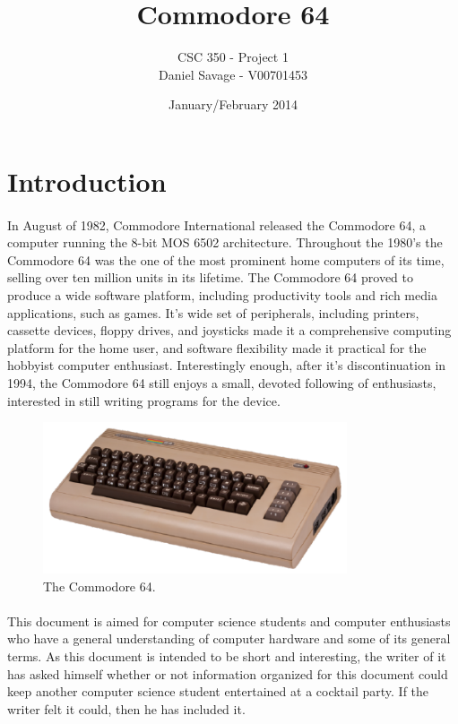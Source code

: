 \documentclass{article}
\title{Commodore 64}
\author{CSC 350 - Project 1 \\ Daniel Savage - V00701453}
\date{January/February 2014}
\begin{document}
   \maketitle
   
\pagebreak{}

\tableofcontents

\pagebreak{}
   
\section{Introduction}
\paragraph{}
In August of 1982, Commodore International released the Commodore 64, a computer running the 8-bit MOS 6502 architecture. Throughout the 1980's the Commodore 64 was the one of the most prominent home computers of its time, selling over ten million units in its lifetime. The Commodore 64 proved to produce a wide software platform, including productivity tools and rich media applications, such as games. It's wide set of peripherals, including printers, cassette devices, floppy drives, and joysticks made it a comprehensive computing platform for the home user, and software flexibility made it practical for the hobbyist computer enthusiast. Interestingly enough, after it's discontinuation in 1994, the Commodore 64 still enjoys a small, devoted following of enthusiasts, interested in still writing programs for the device.

\begin{figure}[h!]
  \centering
    \includegraphics[width=0.8\textwidth]{c64_image}
  \caption{The Commodore 64.}
\end{figure}

\paragraph{}
This document is aimed for computer science students and computer enthusiasts who have a general understanding of computer hardware and some of its general terms. As this document is intended to be short and interesting, the writer of it has asked himself whether or not information organized for this document could keep another computer science student entertained at a cocktail party. If the writer felt it could, then he has included it.
\end{document}
